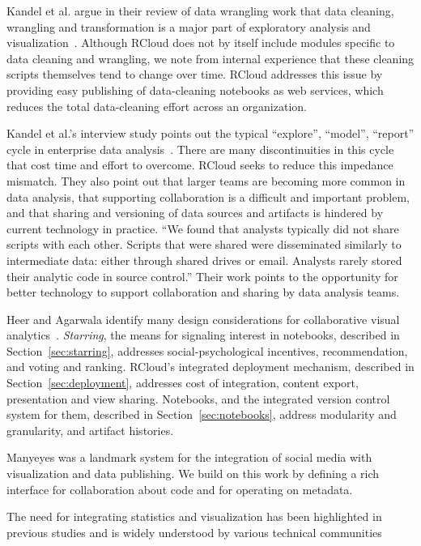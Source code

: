 \documentclass[review,journal]{vgtc}         %
\begin{document}
Kandel et al. argue in their review of data wrangling work that data
cleaning, wrangling and transformation is a major part of exploratory
analysis and visualization~\cite{Kandel:2011:RDI}. Although RCloud
does not by itself include modules specific to data cleaning and
wrangling, we note from internal experience that these cleaning
scripts themselves tend to change over time. RCloud addresses this
issue by providing easy publishing of data-cleaning notebooks as web
services, which reduces the total data-cleaning effort across an
organization.

Kandel et al.'s interview study points out the typical ``explore'',
``model'', ``report'' cycle in enterprise data
analysis~\cite{Kandel:2012:EDA}. There are many discontinuities in
this cycle that cost time and effort to overcome. RCloud seeks to
reduce this impedance mismatch. They also point out that larger teams
are becoming more common in data analysis, that supporting
collaboration is a difficult and important problem, and that sharing
and versioning of data sources and artifacts is hindered by current
technology in practice. ``We found that analysts typically did not
share scripts with each other. Scripts that were shared were
disseminated similarly to intermediate data: either through shared
drives or email. Analysts rarely stored their analytic code in source
control.'' Their work points to the opportunity for better technology
to support collaboration and sharing by data analysis teams.

Heer and Agarwala identify many design considerations for
collaborative visual analytics~\cite{Heer:2008:DCF}. \emph{Starring},
the means for signaling interest in notebooks, described in
Section~\ref{sec:starring}, addresses social-psychological incentives,
recommendation, and voting and ranking. RCloud's integrated deployment
mechanism, described in Section~\ref{sec:deployment}, addresses cost of
integration, content export, presentation and view sharing. Notebooks,
and the integrated version control system for them, described in
Section~\ref{sec:notebooks}, address modularity and granularity, and
artifact histories.

Manyeyes \cite{Viegas:2007:MAS} was a landmark system for the integration
of social media with visualization and data publishing. We build on this
work by defining a rich interface for collaboration about code and for
operating on metadata.

The need for integrating statistics and visualization has been
highlighted in previous studies and is widely understood by
various technical communities \cite{Perer:2008:ISA}
\end{document}
